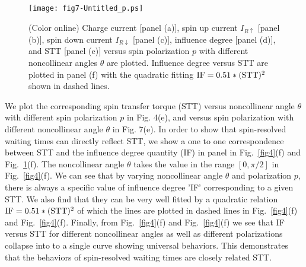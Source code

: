 \documentclass[aps,prb,twocolumn,footinbib,showpacs,superscriptaddress,preprintnumbers,amsmath,amssymb]{revtex4-1}
\begin{document}
\begin{figure}
  \texttt{[image: fig7-Untitled\_p.ps]} \\
  \caption{(Color online) Charge current [panel (a)], spin up current $I_{R\uparrow}$ [panel (b)], spin down current $I_{R\downarrow}$ [panel (c)], influence degree [panel (d)], and STT [panel (e)] versus spin polarization $p$ with different noncollinear angles $\theta$ are plotted. Influence degree versus STT are plotted in panel (f) with the quadratic fitting ${\rm IF}=0.51*({\rm STT})^2$ shown in dashed lines.  }
  \label{fig7}
\end{figure}

	
	We plot the corresponding spin transfer torque (STT) versus noncollinear angle $\theta$ with different spin polarization $p$ in Fig. 4(e), and versus spin polarization with different noncollinear angle $\theta$ in Fig. 7(e). In order to show that spin-resolved waiting times can directly reflect STT, we show a one to one correspondence between STT and the influence degree quantity (IF) in panel in Fig.~\ref{fig4}(f) and Fig.~\ref{fig7}(f). The noncollinear angle $\theta$ takes the value in the range $[0,\pi/2]$ in Fig.~\ref{fig4}(f). 
	We can see that by varying noncollinear angle $\theta$ and polarization $p$, there is always a specific value of influence degree 'IF' corresponding to a given STT. We also find that they can be very well fitted by a quadratic relation ${\rm IF}=0.51*({\rm STT})^2$ of which the lines are plotted in dashed lines in Fig.~\ref{fig4}(f) and Fig.~\ref{fig4}(f). 
Finally, from Fig.~\ref{fig4}(f) and Fig.~\ref{fig4}(f) we see that IF versus STT for different noncollinear angles as well as different polarizations collapse into to a single curve showing universal behaviors. This demonstrates that the behaviors of spin-resolved waiting times are closely related STT.
 
\end{document}
